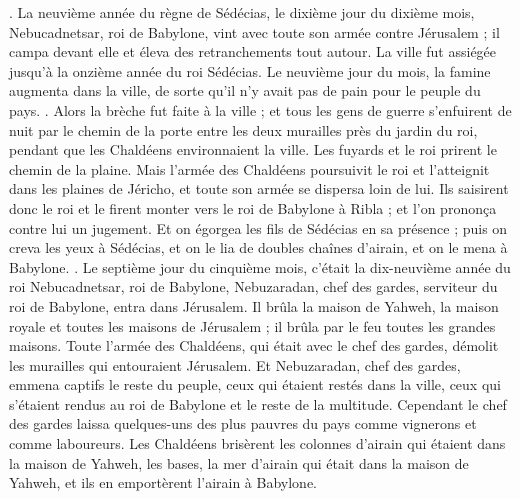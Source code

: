 \begin{multicols}{2}
.
\VerseOne{}La neuvième année du règne de Sédécias, le dixième jour du dixième mois, Nebucadnetsar, roi de Babylone, vint avec toute son armée contre Jérusalem ; il campa devant elle et éleva des retranchements tout autour.
La ville fut assiégée jusqu'à la onzième année du roi Sédécias.
Le neuvième jour du mois, la famine augmenta dans la ville, de sorte qu'il n'y avait pas de pain pour le peuple du pays.
.
Alors la brèche fut faite à la ville ; et tous les gens de guerre s'enfuirent de nuit par le chemin de la porte entre les deux murailles près du jardin du roi, pendant que les Chaldéens environnaient la ville. Les fuyards et le roi prirent le chemin de la plaine.
Mais l'armée des Chaldéens poursuivit le roi et l'atteignit dans les plaines de Jéricho, et toute son armée se dispersa loin de lui.
Ils saisirent donc le roi et le firent monter vers le roi de Babylone à Ribla ; et l'on prononça contre lui un jugement.
Et on égorgea les fils de Sédécias en sa présence ; puis on creva les yeux à Sédécias, et on le lia de doubles chaînes d'airain, et on le mena à Babylone.
.
Le septième jour du cinquième mois, c'était la dix-neuvième année du roi Nebucadnetsar, roi de Babylone, Nebuzaradan, chef des gardes, serviteur du roi de Babylone, entra dans Jérusalem.
Il brûla la maison de Yahweh, la maison royale et toutes les maisons de Jérusalem ; il brûla par le feu toutes les grandes maisons.
Toute l'armée des Chaldéens, qui était avec le chef des gardes, démolit les murailles qui entouraient Jérusalem.
Et Nebuzaradan, chef des gardes, emmena captifs le reste du peuple, ceux qui étaient restés dans la ville, ceux qui s'étaient rendus au roi de Babylone et le reste de la multitude.
Cependant le chef des gardes laissa quelques-uns des plus pauvres du pays comme vignerons et comme laboureurs.
Les Chaldéens brisèrent les colonnes d'airain qui étaient dans la maison de Yahweh, les bases, la mer d'airain qui était dans la maison de Yahweh, et ils en emportèrent l'airain à Babylone.

\end{multicols}
